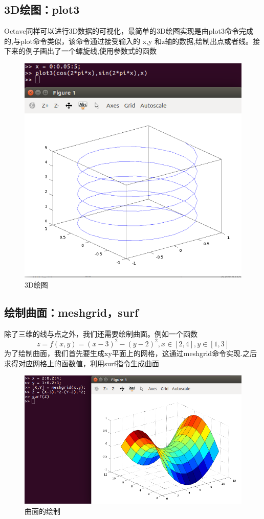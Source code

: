 \documentclass[a4paper,11pt]{ctexart}
\begin{document}
\subsection{3D绘图：plot3}
Octave同样可以进行3D数据的可视化，最简单的3D绘图实现是由plot3命令完成的,与plot命令类似，该命令通过接受输入的 x,y 和z轴的数据,绘制出点或者线。接下来的例子画出了一个螺旋线,使用参数式的函数
\begin{figure}[H]
	\begin{center}
		\includegraphics[width=.8\textwidth]{3dplot.png}
	\end{center}
	\caption{3D绘图}
\end{figure}
\subsection{绘制曲面：meshgrid，surf}
除了三维的线与点之外，我们还需要绘制曲面。例如一个函数
$$z=f(x,y)=(x−3)^2−(y−2)^2,x\in[2,4],y\in[1,3]$$
为了绘制曲面，我们首先要生成xy平面上的网格，这通过meshgrid命令实现.之后求得对应网格上的函数值，利用surf指令生成曲面
\begin{figure}[H]
	\begin{center}
		\includegraphics[width=.8\textwidth]{surf.png}
	\end{center}
	\caption{曲面的绘制}
\end{figure}
\newpage
\end{document}
